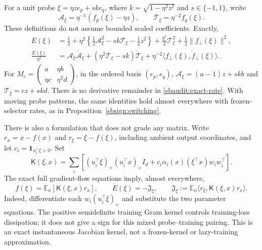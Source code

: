 \documentclass{article} %
\theoremstyle{plain}
\theoremstyle{definition}
\theoremstyle{remark}
\begin{document}
For a unit probe $\xi=\eta z e_p+sk e_q$, where
$k=\sqrt{1-\eta^2z^2}$ and $s\in\{-1,1\}$, write
\[
 \mathcal A_\xi=\eta^{-1}(f_p(\xi)-\eta z),\qquad
 \mathcal T_\xi=\eta^{-2}f_q(\xi).
\]
These definitions do not assume bounded scaled coefficients. Exactly,
\begin{align}
 E(\xi)&=\frac12+\eta^2\left\{
 \frac12\mathcal A_\xi^2-sk\mathcal T_\xi-\frac12z^2
 \right\}+\frac{\eta^4}{2}\mathcal T_\xi^2
                  +\frac12\|f_\perp(\xi)\|^2,
 \label{sbaudit:exact-error}\\
 \frac{\dot E(\xi)}{\eta^2}
 &=\mathcal A_\xi\dot{\mathcal A}_\xi
    +(\eta^2\mathcal T_\xi-sk)\dot{\mathcal T}_\xi
    +\eta^{-2}\langle f_\perp(\xi),\dot f_\perp(\xi)\rangle.
 \label{sbaudit:exact-rate}
\end{align}
For $M_c=\left(\begin{smallmatrix}a&\eta b\\
\eta c&\eta^2d\end{smallmatrix}\right)$, in the ordered basis $(e_p,e_q)$,
$\mathcal A_\xi=(a-1)z+skb$ and $\mathcal T_\xi=cz+skd$.
There is no derivative remainder in \eqref{sbaudit:exact-rate}.
With moving probe patterns, the same identities hold almost everywhere
with frozen-selector rates, as in Proposition~\ref{sbsign:switching}.

There is also a formulation that does not grade any matrix. Write
$r_x=x-f(x)$ and $r_\xi=\xi-f(\xi)$, including ambient output coordinates,
and let $c_i=\mathbf1_{u_i^\top\xi>0}$. Set
\begin{equation}\label{sbaudit:kernel}
 \mathsf K(\xi,x)=\sum_i\left[
 (u_i^\top\xi)_+(u_i^\top x)_+ I_d
 +c_i\alpha_i(x)(\xi^\top x)w_iw_i^\top\right].
\end{equation}
The exact full gradient-flow equations imply, almost everywhere,
\begin{equation}\label{sbaudit:alignment}
 \dot f(\xi)=\mathbb E_n[\mathsf K(\xi,x)r_x],\qquad
 \dot E(\xi)=-\mathfrak J_\xi,\qquad
 \mathfrak J_\xi:=\mathbb E_n\langle r_\xi,\mathsf K(\xi,x)r_x\rangle.
\end{equation}
Indeed, differentiate each $w_i(u_i^\top\xi)_+$ and substitute the two
parameter equations. The positive semidefinite training Gram kernel
controls training-loss dissipation; it does not give a sign for this
mixed probe--training pairing. This is an exact instantaneous Jacobian
kernel, not a frozen-kernel or lazy-training approximation.
\end{document}
